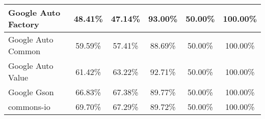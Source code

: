 \documentclass[../main]{subfiles}
\begin{document}
\begin{table}[!htb]
\begin{tabular}{|l|c|c|c|c|c|}
Google Auto Factory           & 48.41\%                                                                                 & 47.14\%                                                                                     & 93.00\%                                                                              & 50.00\%                                                                               & 100.00\%                                                                             \\ \hline
Google Auto Common            & 59.59\%                                                                                 & 57.41\%                                                                                     & 88.69\%                                                                              & 50.00\%                                                                               & 100.00\%                                                                             \\ \hline
Google Auto Value             & 61.42\%                                                                                 & 63.22\%                                                                                     & 92.71\%                                                                              & 50.00\%                                                                               & 100.00\%                                                                             \\ \hline
Google Gson                   & 66.83\%                                                                                 & 67.38\%                                                                                     & 89.77\%                                                                              & 50.00\%                                                                               & 100.00\%                                                                             \\ \hline
commons-io                    & 69.70\%                                                                                 & 67.29\%                                                                                     & 89.72\%                                                                              & 50.00\%                                                                               & 100.00\%                                                                             \\ \hline

\end{tabular}
\end{table}
\end{document}

